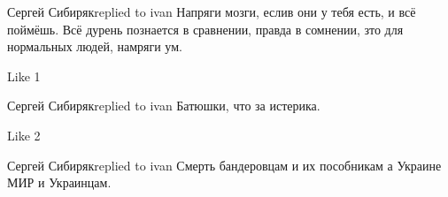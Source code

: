  
 
 
 
 

Сергей Сибирякreplied to ivan
Напряги мозги, еслив они у тебя есть, и всё поймёшь. Всё дурень познается в сравнении, правда в сомнении, зто для нормальных людей, намряги ум.

    Like 1

Сергей Сибирякreplied to ivan
Батюшки, что за истерика.

    Like 2

Сергей Сибирякreplied to ivan
Смерть бандеровцам и их пособникам а Украине МИР и Украинцам.
